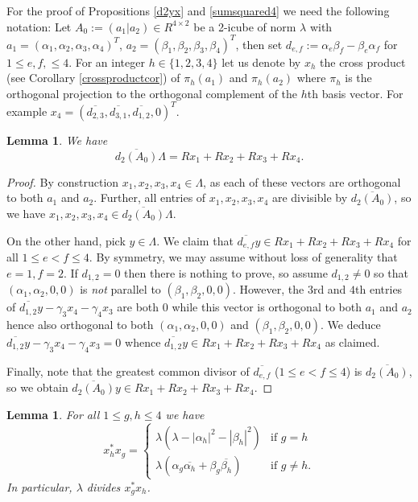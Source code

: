 \documentclass[11pt]{amsart}
\newtheorem{lemma}[proposition]{Lemma}
\theoremstyle{definition}
\theoremstyle{remark}
\begin{document}
For the proof of Propositions \ref{d2yx} and \ref{sumsquared4} we need the following notation: Let $A_0:=(a_1|a_2)\in R^{4\times 2}$ be a 2-icube of norm $\lambda$ with $a_1=(\alpha_1,\alpha_2,\alpha_3,\alpha_4)^T$, 
$a_2=(\beta_1,\beta_2,\beta_3,\beta_4)^T$, then set  
$d_{e,f}:=\alpha_e\beta_f-\beta_e\alpha_f$ for $1\leq e,f,\leq 4$. For an integer $h\in\{1,2,3,4\}$ let us denote by $x_h$ the  cross product (see Corollary \ref{crossproductcor}) of $\pi_h(a_1)$ and $\pi_h(a_2)$ where $\pi_h$ is the orthogonal projection to the orthogonal complement of the $h$th basis vector. For example $x_4=(\overline{d_{2,3}},\overline{d_{3,1}},\overline{d_{1,2}},0)^T$. 
\begin{lemma}\label{generatelemma}
We have \[\overline{d_2(A_0)}\Lambda=Rx_1+Rx_2+Rx_3+Rx_4.\]
\end{lemma}
\begin{proof}
By construction $x_1,x_2,x_3,x_4\in \Lambda$, as each of these vectors are orthogonal to both $a_1$ and $a_2$. Further, all entries of $x_1,x_2,x_3,x_4$ are divisible by $\overline{d_2(A_0)}$, so we have $x_1,x_2,x_3,x_4\in \overline{d_2(A_0)}\Lambda$.

On the other hand, pick $y\in \Lambda$. We claim that $\overline{d_{e,f}}y\in Rx_1+Rx_2+Rx_3+Rx_4$ for all $1\leq e<f\leq 4$. By symmetry, we may assume without loss of generality that $e=1,f=2$. If $d_{1,2}=0$ then there is nothing to prove, so assume $d_{1,2}\neq 0$ so that $(\alpha_1,\alpha_2,0,0)$ is \emph{not} parallel to $(\beta_1,\beta_2,0,0)$. However, the $3$rd and $4$th entries of $\overline{d_{1,2}}y-\gamma_3x_4-\gamma_4x_3$ are both $0$ while this vector is orthogonal to both $a_1$ and $a_2$ hence also orthogonal to both $(\alpha_1,\alpha_2,0,0)$ and $(\beta_1,\beta_2,0,0)$. We deduce $\overline{d_{1,2}}y-\gamma_3x_4-\gamma_4x_3=0$ whence $\overline{d_{1,2}}y\in Rx_1+Rx_2+Rx_3+Rx_4$ as claimed. 

Finally, note that the greatest common divisor of $\overline{d_{e,f}}$ ($1\leq e<f\leq 4$) is $\overline{d_2(A_0)}$, so we obtain $\overline{d_2(A_0)}y\in Rx_1+Rx_2+Rx_3+Rx_4$.
\end{proof}


\begin{lemma}\label{defLemma}
For all $1\leq g,h\leq 4$ we have
\[x_h^*x_g=\begin{cases}\lambda(\lambda-|\alpha_h|^2-|\beta_h|^2)&\text{if }g=h\\
\lambda(\alpha_g\overline{\alpha_h}+\beta_g\overline{\beta_h}) &\text{if }g\neq h .
\end{cases}\]
In particular, $\lambda$ divides $x_g^*x_h$.
\end{lemma}
\end{document}
